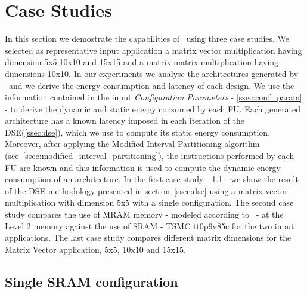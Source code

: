 \section{Case Studies}
In this section we demostrate the capabilities of \frameworkname~using three case studies. We selected as representative input application a matrix vector multiplication having dimension 5x5,10x10 and 15x15 and a matrix matrix multiplication having dimensions 10x10.
In our experiments we analyse the architectures generated by \frameworkname~and we derive the energy consumption and latency of each design. We use the information contained in the input \textit{Configuration Parameters} - \ref{ssec:conf_param} - to derive the dynamic and static energy consumed by each FU. Each generated architecture has a known latency imposed in each iteration of the DSE(\ref{ssec:dse}), which we use to compute its static energy consumption. Moreover, after applying the Modified Interval Partitioning algorithm (see~\ref{ssec:modified_interval_partitioning}), the instructions performed by each FU are known and this information is used to compute the dynamic energy consumption of an architecture.
In the first case study - \ref{ssec:exp_single} - we show the result of the DSE methodology presented in section~\ref{ssec:dse} using a matrix vector multiplication with dimension 5x5 with a single configuration. The second case study compares the use of MRAM memory - modeled according to~\cite{8310393} - at the Level 2 memory against the use of SRAM - TSMC tt0p9v85c for the two input applications. The last case study compares different matrix dimensions for the Matrix Vector application, 5x5, 10x10 and 15x15.


\subsection{Single SRAM configuration}
\label{ssec:exp_single}

